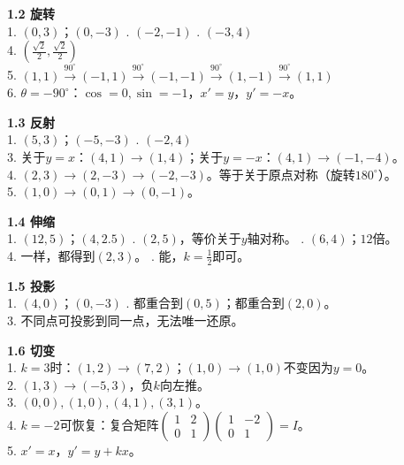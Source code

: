 

\noindent\textbf{1.2 旋转}\\
1. $(0,3)$；$(0,-3)$ . $(-2,-1)$ . $(-3,4)$\\
4. $(\frac{\sqrt2}{2},\frac{\sqrt2}{2})$\\
5. $(1,1)\xrightarrow{90^\circ}(-1,1)\xrightarrow{90^\circ}(-1,-1)\xrightarrow{90^\circ}(1,-1)\xrightarrow{90^\circ}(1,1)$\\
6. $\theta=-90^\circ$：$\cos=0,\sin=-1$，$x'=y$，$y'=-x$。

\noindent\textbf{1.3 反射}\\
1. $(5,3)$；$(-5,-3)$ . $(-2,4)$\\
3. 关于$y=x$：$(4,1)\to(1,4)$；关于$y=-x$：$(4,1)\to(-1,-4)$。\\
4. $(2,3)\to(2,-3)\to(-2,-3)$。等于关于原点对称（旋转$180^\circ$）。\\
5. $(1,0)\to(0,1)\to(0,-1)$。

\noindent\textbf{1.4 伸缩}\\
1. $(12,5)$；$(4,2.5)$ . $(2,5)$，等价关于$y$轴对称。 . $(6,4)$；$12$倍。\\
4. 一样，都得到$(2,3)$。 . 能，$k=\frac12$即可。

\noindent\textbf{1.5 投影}\\
1. $(4,0)$；$(0,-3)$ . 都重合到$(0,5)$；都重合到$(2,0)$。\\
3. 不同点可投影到同一点，无法唯一还原。

\noindent\textbf{1.6 切变}\\
1. $k=3$时：$(1,2)\to(7,2)$；$(1,0)\to(1,0)$不变因为$y=0$。\\
2. $(1,3)\to(-5,3)$，负$k$向左推。\\
3. $(0,0),(1,0),(4,1),(3,1)$。\\
4. $k=-2$可恢复：复合矩阵$\begin{pmatrix}1&2\\0&1\end{pmatrix}\begin{pmatrix}1&-2\\0&1\end{pmatrix}=I$。\\
5. $x'=x$，$y'=y+kx$。

